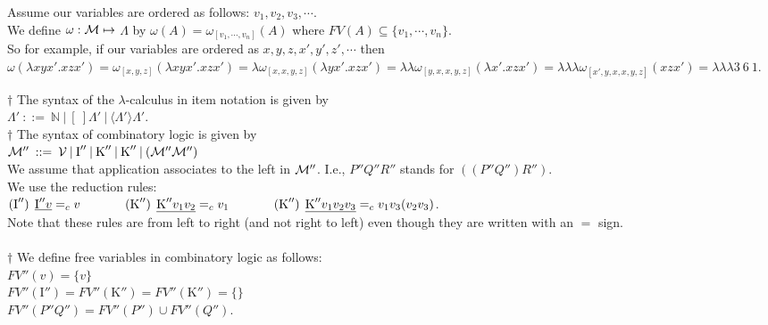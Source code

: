 \documentclass[11pt]{article}
\begin{document}
Assume our variables are ordered as follows: $v_1, v_2, v_3, \cdots$.\\
We define $\omega : {\cal M} \mapsto$ $\Lambda$
by $\omega(A) = \omega_{[v_1,\cdots, v_n]}(A)$ where 
$FV(A) \subseteq \{v_1,\cdots,v_n\}$.\\
So for example, if our variables are ordered as $x,y,z,x',y',z', \cdots$ then $\omega(\lambda xyx'.xzx')
= \omega_{[x,y,z]}(\lambda xyx'.xzx') = \lambda\omega_{[x,x,y,z]}(\lambda yx'.xzx') = \lambda\lambda\omega_{[y,x,x,y,z]}(\lambda x'.xzx') = \lambda\lambda\lambda\omega_{[x',y,x,x,y,z]}(xzx') = \lambda\lambda\lambda 3\:6\:1$.


$\dagger$ The syntax of the $\lambda$-calculus in item notation is given by\\
$\Lambda'  \: ::=  \:  {\mathbb{N}} \:|\: [\:]{\Lambda'} \:|\: \langle \Lambda' \rangle \Lambda'$.\\

$\dagger$ The syntax of combinatory logic is given by\\
${\cal M}''  \: ::=  \:  {\cal V} \:|\: \mbox{I}'' \:|\: \mbox{K}'' \:|\:\mbox{K}''\:|\: ({\cal M}''{\cal M}'')$\\
We assume that application associates to the left in ${\cal M}''$. I.e., $P''Q''R''$ stands for $((P''Q'')R'')$.\\
We use  the reduction rules: \\
$(\mbox{I}'') \: \:  \underline{\mbox{I}'' v} =_c v \hspace{0.5in} (\mbox{K}'') \: \:  \underline{\mbox{K}'' v_1v_2} =_c v_1 \hspace{0.5in} (\mbox{K}'') \:\:   \underline{\mbox{K}'' v_1v_2v_3} =_c v_1v_3(v_2v_3)$.\\
Note that these rules are from left to right (and not right to left) even though they are written with an $=$ sign.\\
\\
$\dagger$ 
We define free variables in combinatory logic as follows:\\
$FV''(v) = \{v\}$\\
$FV''(\mbox{I}'') = FV''(\mbox{K}'') = FV''(\mbox{K}'') = \{\}$\\ $FV''(P''Q'') = FV''(P'')\cup FV''(Q'')$.
\end{document}
